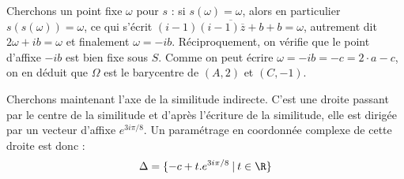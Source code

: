 {\begin{enumerate}
{Cherchons un point fixe $\omega$ pour $s$ : si $s(\omega)=\omega$, alors en particulier $s(s(\omega))=\omega$, ce qui s'écrit $(i-1)\overline{(i-1)\overline{z}+b}+b=\omega $, autrement dit $2\omega+ib = \omega$ et finalement $\omega=-ib$. Réciproquement, on vérifie que le point d'affixe $-ib$ est bien fixe sous $S$. Comme on peut écrire $\omega = -ib = -c = 2\cdot a - c$, on en déduit que $\Omega$ est le barycentre de $(A,2)$ et $(C,-1)$.

Cherchons maintenant l'axe de la similitude indirecte. C'est une droite passant par le centre de la similitude et d'après l'écriture de la similitude, elle est dirigée par un vecteur d'affixe $e^{3i\pi/8}$. Un paramétrage en coordonnée complexe de cette droite est donc :
\[\Delta = \{ -c+t.e^{3i\pi/8}\:|\: t\in \R\}
\]}
\end{enumerate}
}